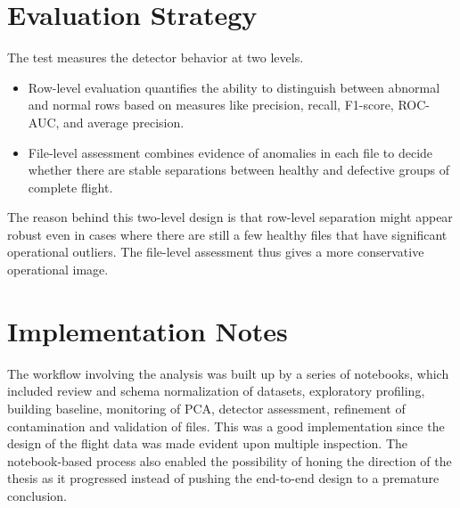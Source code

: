 \documentclass[12pt,a4paper]{report}
\begin{document}
	\section{Evaluation Strategy}
	
	The test measures the detector behavior at two levels.
	
	\begin{itemize}
		\item Row-level evaluation quantifies the ability to distinguish between abnormal and normal rows based on measures like precision, recall, F1-score, ROC-AUC, and average precision.
		\item File-level assessment combines evidence of anomalies in each file to decide whether there are stable separations between healthy and defective groups of complete flight.
	\end{itemize}
	
	The reason behind this two-level design is that row-level separation might appear robust even in cases where there are still a few healthy files that have significant operational outliers. The file-level assessment thus gives a more conservative operational image.
	
	\section{Implementation Notes}
	
	The workflow involving the analysis was built up by a series of notebooks, which included review and schema normalization of datasets, exploratory profiling, building baseline, monitoring of PCA, detector assessment, refinement of contamination and validation of files. This was a good implementation since the design of the flight data was made evident upon multiple inspection. The notebook-based process also enabled the possibility of honing the direction of the thesis as it progressed instead of pushing the end-to-end design to a premature conclusion.
	
\end{document}
